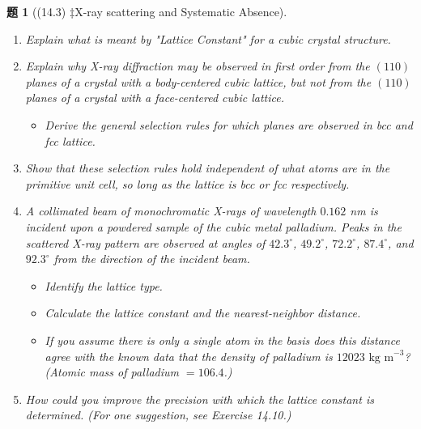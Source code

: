 \documentclass[UTF8,10pt,a4paper]{article}
\theoremstyle{Problem}
\newtheorem{prob}{题}
\theoremstyle{Solution}
\begin{document}
\begin{prob}[(14.3) $\ddagger$X-ray scattering and Systematic Absence]
    \begin{enumerate}
        \item[(a)] Explain what is meant by "Lattice Constant" for a cubic crystal structure.
        \item[(b)] Explain why X-ray diffraction may be observed in first order from the $(110)$ planes of a crystal with a body-centered cubic lattice, but not from the $(110)$ planes of a crystal with a face-centered cubic lattice.
        \begin{itemize}
            \item[$\triangleright$] Derive the general selection rules for which planes are observed in bcc and fcc lattice.
        \end{itemize}
        \item[(c)] Show that these selection rules hold independent of what atoms are in the primitive unit cell, so long as the lattice is bcc or fcc respectively.
        \item[(d)] A collimated beam of monochromatic X-rays of wavelength $0.162$ nm is incident upon a powdered sample of the cubic metal palladium. Peaks in the scattered X-ray pattern are observed at angles of $42.3^{\circ}$, $49.2^{\circ}$, $72.2^{\circ}$, $87.4^{\circ}$, and $92.3^{\circ}$ from the direction of the incident beam.
        \begin{itemize}
            \item[$\triangleright$] Identify the lattice type.
            \item[$\triangleright$] Calculate the lattice constant and the nearest-neighbor distance.
            \item[$\triangleright$] If you assume there is only a single atom in the basis does this distance agree with the known data that the density of palladium is $12023\text{ kg m}^{-3}$? (Atomic mass of palladium $=106.4$.)
        \end{itemize}
        \item[(e)] How could you improve the precision with which the lattice constant is determined. (For one suggestion, see Exercise 14.10.)
    \end{enumerate}
\end{prob}
\end{document}
